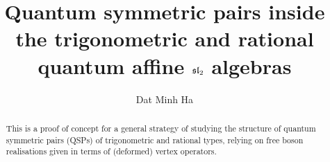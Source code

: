 

\setcounter{section}{-1}





    \title{Quantum symmetric pairs inside the trigonometric and rational quantum affine $\sl_2$ algebras}
    
    \author{Dat Minh Ha}
    \maketitle
    
    \begin{abstract}
        This is a proof of concept for a general strategy of studying the structure of quantum symmetric pairs (QSPs) of trigonometric and rational types, relying on free boson realisations given in terms of (deformed) vertex operators.
    \end{abstract}
    
    {
    \hypersetup{} 
    \tableofcontents %
    }

    \newpage

    

    \newpage

    

    \newpage

    

    \newpage

    

    \newpage
    
    \printbibliography

